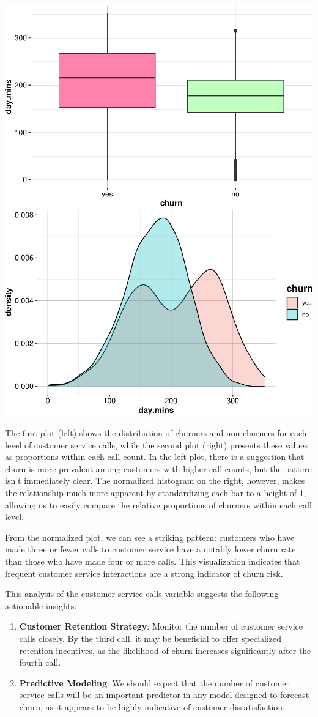 \documentclass[
]{book}
\providecommand{\tightlist}{%
  \setlength{\itemsep}{0pt}\setlength{\parskip}{0pt}}
\theoremstyle{definition}
\theoremstyle{definition}
\theoremstyle{definition}
\theoremstyle{definition}
\theoremstyle{remark}
\begin{document}
\includegraphics[width=0.5\linewidth]{EDA_files/figure-latex/unnamed-chunk-11-1} \includegraphics[width=0.5\linewidth]{EDA_files/figure-latex/unnamed-chunk-11-2}

The first plot (left) shows the distribution of churners and non-churners for each level of customer service calls, while the second plot (right) presents these values as proportions within each call count. In the left plot, there is a suggestion that churn is more prevalent among customers with higher call counts, but the pattern isn't immediately clear. The normalized histogram on the right, however, makes the relationship much more apparent by standardizing each bar to a height of 1, allowing us to easily compare the relative proportions of churners within each call level.

From the normalized plot, we can see a striking pattern: customers who have made three or fewer calls to customer service have a notably lower churn rate than those who have made four or more calls. This visualization indicates that frequent customer service interactions are a strong indicator of churn risk.

This analysis of the customer service calls variable suggests the following actionable insights:

\begin{enumerate}
\def\labelenumi{\arabic{enumi}.}
\tightlist
\item
  \textbf{Customer Retention Strategy}: Monitor the number of customer service calls closely. By the third call, it may be beneficial to offer specialized retention incentives, as the likelihood of churn increases significantly after the fourth call.
\item
  \textbf{Predictive Modeling}: We should expect that the number of customer service calls will be an important predictor in any model designed to forecast churn, as it appears to be highly indicative of customer dissatisfaction.
\end{enumerate}
\end{document}
